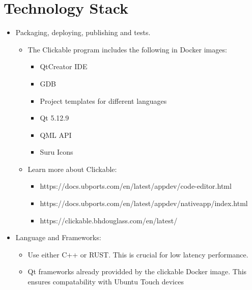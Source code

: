 \section{Technology Stack}



\begin{itemize}
	\item Packaging, deploying, publishing and tests.
	\begin{itemize}
		\item The Clickable program includes the following in Docker images:
		\begin{itemize}
			\item QtCreator IDE
			\item GDB
			\item Project templates for different languages
			\item Qt 5.12.9
			\item QML API
			\item Suru Icons
		\end{itemize}
		\item Learn more about Clickable:
		\begin{itemize}
			\item https://docs.ubports.com/en/latest/appdev/code-editor.html
			\item https://docs.ubports.com/en/latest/appdev/nativeapp/index.html
			\item https://clickable.bhdouglass.com/en/latest/
		\end{itemize} 
	\end{itemize}	
	\item Language and Frameworks:
	\begin{itemize}
		\item Use either C++ or RUST. This is crucial for low latency performance.
		\item Qt frameworks already providded by the clickable Docker image. This ensures compatability with Ubuntu Touch devices
	\end{itemize}
\end{itemize}
